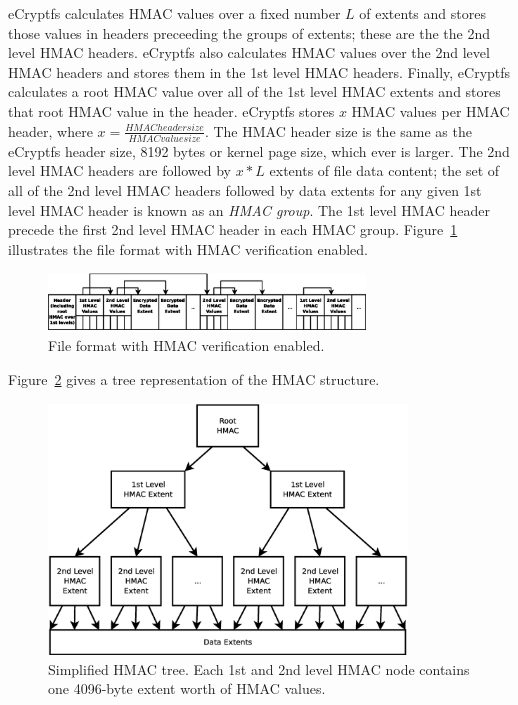 \documentclass{article}
\begin{document}
eCryptfs calculates HMAC values over a fixed number $L$ of extents
and stores those values in headers preceeding the groups of extents; these
are the the 2nd level HMAC headers. eCryptfs also calculates HMAC values
over the 2nd level HMAC headers and stores them in the 1st level HMAC
headers. Finally, eCryptfs calculates a root HMAC value over all of
the 1st level HMAC extents and stores that root HMAC value in the
header. eCryptfs stores $x$ HMAC values per HMAC header, where
$x=\frac{HMAC header size}{HMAC value size}$. The HMAC header size is
the same as the eCryptfs header size, 8192 bytes or kernel page size, which
ever is larger. The 2nd level HMAC headers are
followed by $x * L$ extents of file data content; the set of all of the
2nd level HMAC headers followed by data extents for any given 1st
level HMAC header is known as an \emph{HMAC group}. The 1st level HMAC
header precede the first 2nd level HMAC header in each HMAC group.
Figure~\ref{hmac_file_format} illustrates the file format with HMAC
verification enabled.

\begin{figure}[t]
  \begin{center}
    \includegraphics[width=0.75\textwidth]{file_format}
    \caption{File format with HMAC verification enabled.}
    \label{hmac_file_format}
  \end{center}
\end{figure}

Figure~\ref{hmac_tree} gives a tree representation of the HMAC
structure.

\begin{figure}[t]
  \begin{center}
    \includegraphics[width=0.85\textwidth]{hmac_tree}
    \caption{Simplified HMAC tree. Each 1st and 2nd level HMAC node
    contains one 4096-byte extent worth of HMAC values.}
    \label{hmac_tree}
  \end{center}
\end{figure}
\end{document}
